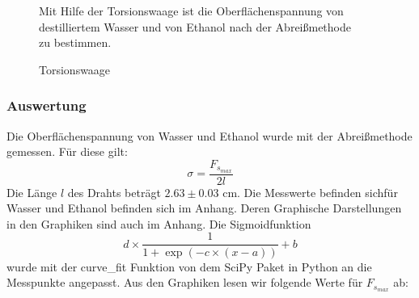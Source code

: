 \documentclass[11pt,a4paper]{article}
\begin{document}
\begin{figure}[h]
\begin{minipage}{.7\textwidth}
Mit Hilfe der Torsionswaage ist die Oberfl\"achenspannung von\\ destilliertem Wasser und von Ethanol nach der Abrei\ss methode\\ zu bestimmen.
\end{minipage}%
\begin{minipage}{.3\textwidth}
\centering
{}
   \renewcommand\thefigure{B2}
\caption{Torsionswaage}
\label{NS1}
\end{minipage}
\end{figure}
\subsubsection{Auswertung}
Die Oberfl\"achenspannung von Wasser und Ethanol wurde mit der Abrei\ss methode gemessen. F\"ur diese gilt:
\begin{equation}
\sigma=\frac{F_{s_{max}}}{2l}\label{eqo}
\end{equation}
Die L\"ange $l$ des Drahts betr\"agt $2.63\pm0.03$ cm. Die Messwerte befinden sichf\"ur Wasser und Ethanol befinden sich im Anhang. Deren Graphische Darstellungen in den Graphiken sind auch im Anhang. Die Sigmoidfunktion 
\begin{equation}
d\times\frac{1}{1+\exp(-c\times(x-a))}+b
\end{equation} 
wurde mit der curve\_fit Funktion von dem SciPy Paket in Python an die Messpunkte angepasst. Aus den Graphiken lesen wir folgende Werte f\"ur $F_{s_{max}}$ ab:
\end{document}
